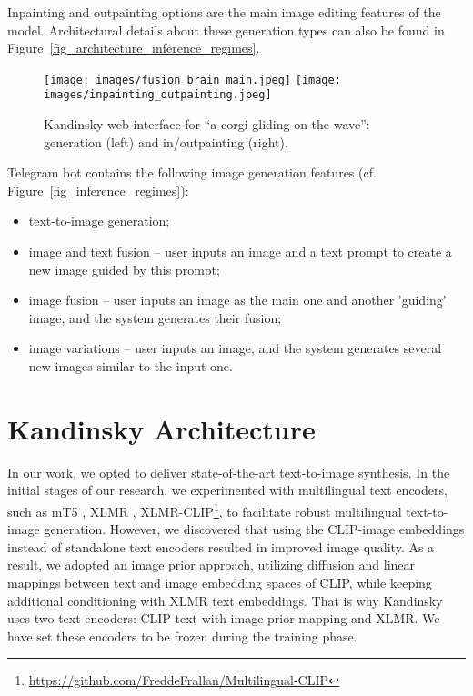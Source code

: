 \documentclass[11pt]{article}
\begin{document}
Inpainting and outpainting options are the main image editing features of the model. Architectural details about these generation types can also be found in Figure~\ref{fig_architecture_inference_regimes}.


\begin{figure*}
  \centering
\texttt{[image: images/fusion\_brain\_main.jpeg]}
\texttt{[image: images/inpainting\_outpainting.jpeg]}
    
  \caption{Kandinsky web interface for ``a corgi gliding on the wave'': generation (left) and in/outpainting (right).}
  \label{fusionbrain UI}
\end{figure*}



Telegram bot contains the following image generation features (cf. Figure~\ref{fig_inference_regimes}):
\begin{itemize}
    \item text-to-image generation;
    \item image and text fusion -- user inputs an image and a text prompt to create a new image guided by this prompt;
    \item image fusion -- user inputs an image as the main one and another 'guiding' image, and the system generates their fusion;
    \item image variations -- user inputs an image, and the system generates several new images similar to the input one.
\end{itemize}


\section{Kandinsky Architecture}

In our work, we opted to deliver state-of-the-art text-to-image synthesis. In the initial stages of our research, we experimented with multilingual text encoders, such as mT5 \cite{DBLP:conf/naacl/XueCRKASBR21}, XLMR \cite{DBLP:conf/acl/ConneauKGCWGGOZ20}, XLMR-CLIP\footnote{\url{https://github.com/FreddeFrallan/Multilingual-CLIP}}, to facilitate robust multilingual text-to-image generation. However, we discovered that using the CLIP-image embeddings instead of standalone text encoders resulted in improved image quality. As a result, we adopted an image prior approach, utilizing diffusion and linear mappings between text and image embedding spaces of CLIP, while keeping additional conditioning with XLMR text embeddings. That is why Kandinsky uses two text encoders: CLIP-text with image prior mapping and XLMR. We have set these encoders to be frozen during the training phase.
\end{document}
